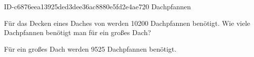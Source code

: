 \begin{exercise}
      {ID-c6876eea13925ded3dee36ac8880e5fd2e4ae720}
      {Dachpfannen}
  \ifproblem\problem\par
    Für das Decken eines Daches von  werden \num{10200} Dachpfannen benötigt.
    Wie viele Dachpfannen benötigt man für ein  großes Dach?
  \fi
  \ifoutcome\outcome\par
    Für ein  großes Dach werden \num{9525} Dachpfannen benötigt.
  \fi
\end{exercise}
